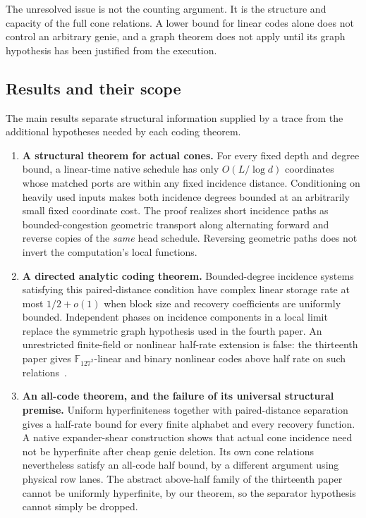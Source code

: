 The unresolved issue is not the counting argument. It is the structure and capacity of the full cone relations. A lower bound for linear codes alone does not control an arbitrary genie, and a graph theorem does not apply until its graph hypothesis has been justified from the execution.

\subsection{Results and their scope}
The main results separate structural information supplied by a trace from the additional hypotheses needed by each coding theorem.

\begin{enumerate}[label=\textup{(\arabic*)}]
\item \textbf{A structural theorem for actual cones.} For every fixed depth and degree bound, a linear-time native schedule has only $O(L/\log d)$ coordinates whose matched ports are within any fixed incidence distance. Conditioning on heavily used inputs makes both incidence degrees bounded at an arbitrarily small fixed coordinate cost. The proof realizes short incidence paths as bounded-congestion geometric transport along alternating forward and reverse copies of the \emph{same} head schedule. Reversing geometric paths does not invert the computation's local functions.

\item \textbf{A directed analytic coding theorem.} Bounded-degree incidence systems satisfying this paired-distance condition have complex linear storage rate at most $1/2+o(1)$ when block size and recovery coefficients are uniformly bounded. Independent phases on incidence components in a local limit replace the symmetric graph hypothesis used in the fourth paper. An unrestricted finite-field or nonlinear half-rate extension is false: the thirteenth paper gives $\mathbb F_{127^2}$-linear and binary nonlinear codes above half rate on such relations~\cite{StorageCodes2026}.

\item \textbf{An all-code theorem, and the failure of its universal structural premise.} Uniform hyperfiniteness together with paired-distance separation gives a half-rate bound for every finite alphabet and every recovery function. A native expander-shear construction shows that actual cone incidence need not be hyperfinite after cheap genie deletion. Its own cone relations nevertheless satisfy an all-code half bound, by a different argument using physical row lanes. The abstract above-half family of the thirteenth paper cannot be uniformly hyperfinite, by our theorem, so the separator hypothesis cannot simply be dropped.


\end{enumerate}

